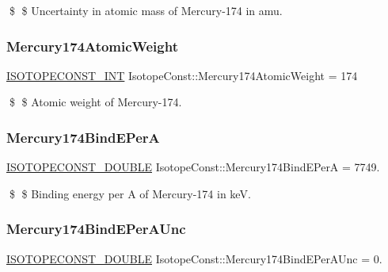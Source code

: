 \$ \$ Uncertainty in atomic mass of Mercury-\/174 in amu. \mbox{\label{group___isotope_const-_mercury-_hg174_gaf1a645f6dd54bf240a557d12cf45a0cf}} 
\subsubsection{\texorpdfstring{Mercury174\+Atomic\+Weight}{Mercury174AtomicWeight}}
{\footnotesize\ttfamily \mbox{\hyperlink{group___isotope_const-_macros_ga5f18360b3e99483a35c32d789e62621c}{I\+S\+O\+T\+O\+P\+E\+C\+O\+N\+S\+T\+\_\+\+I\+NT}} Isotope\+Const\+::\+Mercury174\+Atomic\+Weight = 174}

\$ \$ Atomic weight of Mercury-\/174. \mbox{\label{group___isotope_const-_mercury-_hg174_ga1d42244ec4b1a5d85e8bda9214ecc3dc}} 
\subsubsection{\texorpdfstring{Mercury174\+Bind\+E\+PerA}{Mercury174BindEPerA}}
{\footnotesize\ttfamily \mbox{\hyperlink{group___isotope_const-_macros_ga8f45a7272ce02c0b4c65c44636ed719a}{I\+S\+O\+T\+O\+P\+E\+C\+O\+N\+S\+T\+\_\+\+D\+O\+U\+B\+LE}} Isotope\+Const\+::\+Mercury174\+Bind\+E\+PerA = 7749.}

\$ \$ Binding energy per A of Mercury-\/174 in keV. \mbox{\label{group___isotope_const-_mercury-_hg174_ga07cf95ac00c9f1ee3354d31d79cfd8bc}} 
\subsubsection{\texorpdfstring{Mercury174\+Bind\+E\+Per\+A\+Unc}{Mercury174BindEPerAUnc}}
{\footnotesize\ttfamily \mbox{\hyperlink{group___isotope_const-_macros_ga8f45a7272ce02c0b4c65c44636ed719a}{I\+S\+O\+T\+O\+P\+E\+C\+O\+N\+S\+T\+\_\+\+D\+O\+U\+B\+LE}} Isotope\+Const\+::\+Mercury174\+Bind\+E\+Per\+A\+Unc = 0.}


